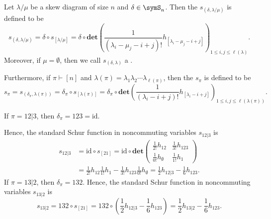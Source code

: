 \begin{definition}
Let $\lambda/\mu$ be a skew diagram of size $n$ and $\delta \in \symS_n$.
Then the 
\label{skewSchurNoncommuting}
$s_{(\delta, \lambda /\mu)}$ is defined to be
\begin{equation}
s_{(\delta, \lambda /\mu)}
= \delta \circ s_{[\lambda/\mu]}
= \delta \circ \mathbf{det} \left(
\frac{1}{(\lambda _i -\mu _j - i +j)! }
h_{[\lambda _i -\mu_j - i + j]}\right) _{1\leq i,j \leq \ell(\lambda)}.
\end{equation}
Moreover, if $\mu = \emptyset$, then we call $s_{(\delta, \lambda)}$ a
\label{SchurNoncommuting}.

Furthermore, if $\pi \vdash [n]$ and
$\lambda (\pi) = \lambda _1 \lambda _2 \dotsm \lambda _{\ell(\pi)}$, then the
\label{standardSchurNoncommuting} $s_\pi$ is defined to be
\begin{equation}
s_{\pi}
= s_{(\delta _\pi, \lambda (\pi))}= \delta _\pi \circ s_{[\lambda (\pi)]} =
\delta_\pi \circ \mathbf{det}
\left( \frac{1}{(\lambda   _i  - i +j)! }
h_{[\lambda   _i  - i + j]}\right) _{1\leq i,j \leq \ell(\lambda(\pi))}.
\end{equation}
\end{definition}



\begin{example*}
If $\pi = 12|3$, then $\delta _\pi = 123 = \mathrm{id}$.

Hence, the standard Schur function in noncommuting variables $s_{12|3}$ is
\begin{align*}
s_{12|3} &= \mathrm{id} \circ s_{[21]} = \mathrm{id} \circ \mathbf{det}
\begin{pmatrix} \frac{1}{2!} h_{12}& \frac{1}{3!} h_{123}\\
\frac{1}{0!} h_{\emptyset}& \frac{1}{1!} h_{1}
\end{pmatrix}\\
&= \frac{1}{2!} h_{12} \frac{1}{1!} h_{1}
- \frac{1}{3!} h_{123}\frac{1}{0!} h_{\emptyset}
= \frac{1}{2} h_{12|3} - \frac{1}{6} h_{123}.
\end{align*}
If $\pi = 13|2$, then $\delta _\pi = 132$.
Hence, the standard Schur function in noncommuting variables $s_{13|2}$ is
\[
s_{13|2}
= 132 \circ s_{[21]}
= 132\circ \left(\frac{1}{2} h_{12|3} - \frac{1}{6} h_{123}\right)
= \frac{1}{2} h_{13|2} - \frac{1}{6} h_{123}.
\]
\end{example*}

